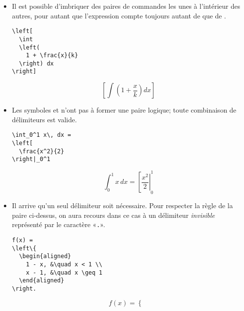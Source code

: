 \begin{itemize}
\item Il est possible d'imbriquer des paires de commandes les unes à
  l'intérieur des autres, pour autant que l'expression compte toujours
  autant de \cmdprint{\left} que de \cmdprint{\right}.
  \begin{demo}
    \begin{texample}
\begin{lstlisting}
\left[
  \int
  \left(
    1 + \frac{x}{k}
  \right) dx
\right]
\end{lstlisting}
      \producing
      \begin{equation*}
        \left[
          \int
          \left(
            1 + \frac{x}{k}
          \right) dx
        \right]
      \end{equation*}
    \end{texample}
  \end{demo}
%
\item Les symboles  et  n'ont pas à
  former une paire logique; toute combinaison de délimiteurs est
  valide.
  \begin{demo}
    \begin{texample}
\begin{lstlisting}
\int_0^1 x\, dx =
\left[
  \frac{x^2}{2}
\right|_0^1
\end{lstlisting}
      \producing
      \begin{equation*}
        \int_0^1 x\, dx =
        \left[
          \frac{x^2}{2}
        \right|_0^1
      \end{equation*}
    \end{texample}
  \end{demo}
%
\item Il arrive qu'un seul délimiteur soit nécessaire. Pour respecter
  la règle de la paire ci-dessus, on aura recours dans ce cas à un
  délimiteur \emph{invisible} représenté par le caractère «\verb=.=».
  \begin{demo}
    \begin{texample}
\begin{lstlisting}
f(x) =
\left\{
  \begin{aligned}
    1 - x, &\quad x < 1 \\
    x - 1, &\quad x \geq 1
  \end{aligned}
\right.
\end{lstlisting}
      \producing
      \begin{equation*}
        f(x) =
        \left\{
          \begin{aligned}

\end{aligned}
\end{equation*}
\end{texample}
\end{demo}
\end{itemize}

